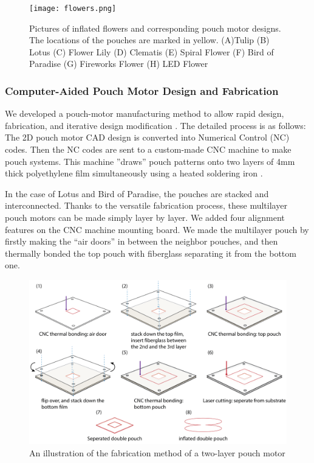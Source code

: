 \documentclass[letterpaper, 10 pt, conference]{ieeeconf}  %
\begin{document}
\begin{figure}[thpb]
	\centering
	\texttt{[image: flowers.png]}
	\caption{Pictures of inflated flowers and corresponding pouch motor designs. The locations of the pouches are marked in yellow. (A)Tulip (B) Lotus (C) Flower Lily (D) Clematis (E) Spiral Flower (F) Bird of Paradise (G) Fireworks Flower (H) LED Flower }
	\label{flowers}
\end{figure}

\subsubsection{\textbf{Computer-Aided Pouch Motor Design and Fabrication}}

We developed a pouch-motor manufacturing method to allow rapid design, fabrication, and iterative design modification \cite{NiiyamaIJRR2014}.  The detailed process is as follows: The 2D pouch motor CAD design is converted into Numerical Control (NC) codes. Then the NC codes are sent to a custom-made CNC machine to make pouch systems. This machine ''draws'' pouch patterns onto two layers of 4mm thick polyethylene film simultaneously using a heated soldering iron \cite{NiiyamaIJRR2014}. %

In the case of Lotus and Bird of Paradise, the pouches are stacked and interconnected. Thanks to the versatile fabrication process, these multilayer pouch motors can be made simply layer by layer. We added four alignment features on the CNC machine mounting board. We made the multilayer pouch by firstly making the ``air doors'' in between the neighbor pouches, and then thermally bonded the top pouch with fiberglass separating it from the bottom one.

\begin{figure}[thpb]
	\centering
	\includegraphics[scale=.25]{doublepouch.png}
	\caption{An illustration of the fabrication method of a two-layer pouch motor}
	\label{doublepouch}
\end{figure}
\end{document}
